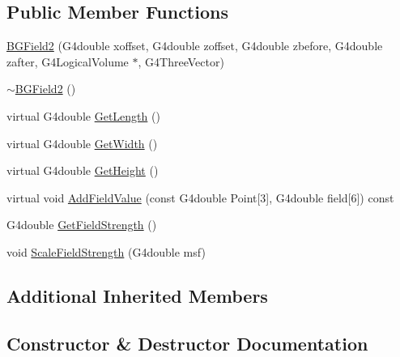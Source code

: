 \subsection*{Public Member Functions}
\begin{DoxyCompactItemize}
\item 
\hyperlink{classBGField2_abd68036adc384301852a843bb85bc704}{B\+G\+Field2} (G4double xoffset, G4double zoffset, G4double zbefore, G4double zafter, G4\+Logical\+Volume $\ast$, G4\+Three\+Vector)
\item 
\hyperlink{classBGField2_a9b2e9bb4823f267d906e5155c65f7a96}{$\sim$\+B\+G\+Field2} ()
\item 
virtual G4double \hyperlink{classBGField2_a856d0ce173b04e35c0e59ab14694d6ac}{Get\+Length} ()
\item 
virtual G4double \hyperlink{classBGField2_aa73fc7a95de254dd1aaba6d7b6248c68}{Get\+Width} ()
\item 
virtual G4double \hyperlink{classBGField2_a8eb93f9ddd438617d363e8b194908d64}{Get\+Height} ()
\item 
virtual void \hyperlink{classBGField2_a6300d564c8722820ee8dd7d215283116}{Add\+Field\+Value} (const G4double Point\mbox{[}3\mbox{]}, G4double field\mbox{[}6\mbox{]}) const 
\item 
G4double \hyperlink{classBGField2_ac93970710ba6895256e4dba9ce459c1c}{Get\+Field\+Strength} ()
\item 
void \hyperlink{classBGField2_ae7f476b27eace05e7c6a6176e774eb77}{Scale\+Field\+Strength} (G4double msf)
\end{DoxyCompactItemize}
\subsection*{Additional Inherited Members}


\subsection{Constructor \& Destructor Documentation}
